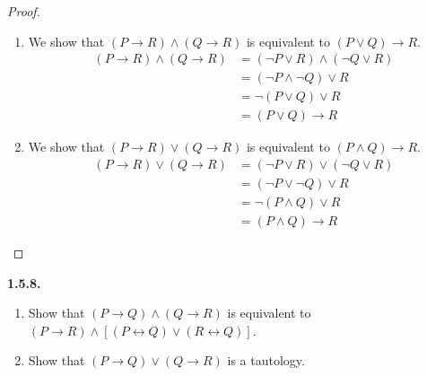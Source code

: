 \documentclass[12pt]{amsart}
\newenvironment{statement}[1]{\smallskip\noindent\color[rgb]{.6627, .3529, .6314} {\bf #1.}}{}
\theoremstyle{definition}
\theoremstyle{remark}
\begin{document}
\begin{proof}
\hfill
\begin{enumerate}
	\item We show that $(P \rightarrow R) \wedge (Q \rightarrow R)$ is equivalent to $(P \vee Q) \rightarrow R$.
	\begin{align*}
		(P \rightarrow R) \wedge (Q \rightarrow R)
		&= (\neg P \vee R) \wedge (\neg Q \vee R) \\
		&= (\neg P \wedge \neg Q) \vee R \\
		&= \neg (P \vee Q) \vee R \\
		&= (P \vee Q) \rightarrow R
	\end{align*}
	
	\item We show that $(P \rightarrow R) \vee (Q \rightarrow R)$ is equivalent to $(P \wedge Q) \rightarrow R$.
	\begin{align*}
		(P \rightarrow R) \vee (Q \rightarrow R)
		&= (\neg P \vee R) \vee (\neg Q \vee R) \\
		&= (\neg P \vee \neg Q) \vee R \\
		&= \neg (P \wedge Q) \vee R \\
		&= (P \wedge Q) \rightarrow R
	\end{align*}
\end{enumerate}
\end{proof}


\begin{statement}{1.5.8}
\begin{enumerate}
	\item Show that $(P \rightarrow Q) \wedge (Q \rightarrow R)$ is equivalent to $(P \rightarrow R) \wedge [(P \leftrightarrow Q) \vee (R \leftrightarrow Q)]$.
	
	\item Show that $(P \rightarrow Q) \vee (Q \rightarrow R)$ is a tautology.
\end{enumerate}
\end{statement}
\end{document}

